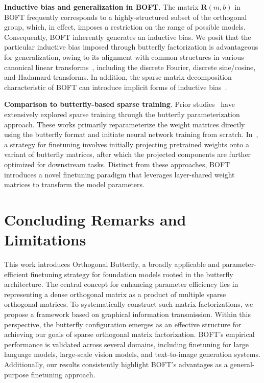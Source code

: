 \textbf{Inductive bias and generalization in BOFT}. The matrix $\bm{R}(m,b)$ in BOFT frequently corresponds to a highly-structured subset of the orthogonal group, which, in effect, imposes a restriction on the range of possible models. Consequently, BOFT inherently generates an inductive bias. We posit that the particular inductive bias imposed through butterfly factorization is advantageous for generalization, owing to its alignment with common structures in various canonical linear transforms~\cite{dao2019kaleidoscope}, including the discrete Fourier, discrete sine/cosine, and Hadamard transforms. In addition, the sparse matrix decomposition characteristic of BOFT can introduce implicit forms of inductive bias~\cite{gunasekar2017implicit,li2018algorithmic,liu2019neural}.

\textbf{Comparison to butterfly-based sparse training}. Prior studies~\cite{dao2019learning,dao2019kaleidoscope,chen2022pixelated,dao2022monarch} have extensively explored sparse training through the butterfly parameterization approach. These works primarily reparameterize the weight matrices directly using the butterfly format and initiate neural network training from scratch. In~\cite{dao2022monarch}, a strategy for finetuning involves initially projecting pretrained weights onto a variant of butterfly matrices, after which the projected components are further optimized for downstream tasks. Distinct from these approaches, BOFT introduces a novel finetuning paradigm that leverages layer-shared weight matrices to transform the model parameters.



\section{Concluding Remarks and Limitations}

This work introduces Orthogonal Butterfly, a broadly applicable and parameter-efficient finetuning strategy for foundation models rooted in the butterfly architecture. The central concept for enhancing parameter efficiency lies in representing a dense orthogonal matrix as a product of multiple sparse orthogonal matrices. To systematically construct such matrix factorizations, we propose a framework based on graphical information transmission. Within this perspective, the butterfly configuration emerges as an effective structure for achieving our goals of sparse orthogonal matrix factorization. BOFT’s empirical performance is validated across several domains, including finetuning for large language models, large-scale vision models, and text-to-image generation systems. Additionally, our results consistently highlight BOFT's advantages as a general-purpose finetuning approach.

